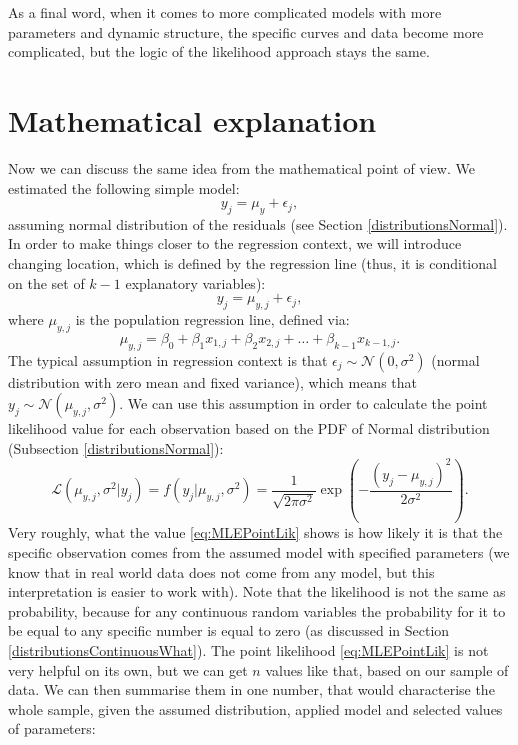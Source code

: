 \documentclass[
]{book}
\theoremstyle{definition}
\theoremstyle{definition}
\theoremstyle{definition}
\theoremstyle{definition}
\theoremstyle{remark}
\begin{document}
As a final word, when it comes to more complicated models with more parameters and dynamic structure, the specific curves and data become more complicated, but the logic of the likelihood approach stays the same.

\hypertarget{likelihoodApproachMaths}{%
\section{Mathematical explanation}\label{likelihoodApproachMaths}}

Now we can discuss the same idea from the mathematical point of view. We estimated the following simple model:
\begin{equation}
    y_j = \mu_{y} + \epsilon_j,
    \label{eq:MLEConstant}
\end{equation}
assuming normal distribution of the residuals (see Section \ref{distributionsNormal}). In order to make things closer to the regression context, we will introduce changing location, which is defined by the regression line (thus, it is conditional on the set of \(k-1\) explanatory variables):
\begin{equation}
    y_j = \mu_{y,j} + \epsilon_j,
    \label{eq:MLESimpleRegression}
\end{equation}
where \(\mu_{y,j}\) is the population regression line, defined via:
\begin{equation}
    \mu_{y,j} = \beta_0 + \beta_1 x_{1,j}+ \beta_2 x_{2,j} + \dots + \beta_{k-1} x_{k-1,j} .
    \label{eq:MLERegression}
\end{equation}
The typical assumption in regression context is that \(\epsilon_j \sim \mathcal{N}(0, \sigma^2)\) (normal distribution with zero mean and fixed variance), which means that \(y_j \sim \mathcal{N}(\mu_{y,j}, \sigma^2)\). We can use this assumption in order to calculate the point likelihood value for each observation based on the PDF of Normal distribution (Subsection \ref{distributionsNormal}):
\begin{equation}
    \mathcal{L} (\mu_{y,j}, \sigma^2 | y_j) = f(y_j | \mu_{y,j}, \sigma^2) = \frac{1}{\sqrt{2 \pi \sigma^2}} \exp \left( -\frac{\left(y_j - \mu_{y,j} \right)^2}{2 \sigma^2} \right).
    \label{eq:MLEPointLik}
\end{equation}
Very roughly, what the value \eqref{eq:MLEPointLik} shows is how likely it is that the specific observation comes from the assumed model with specified parameters (we know that in real world data does not come from any model, but this interpretation is easier to work with). Note that the likelihood is not the same as probability, because for any continuous random variables the probability for it to be equal to any specific number is equal to zero (as discussed in Section \ref{distributionsContinuousWhat}). The point likelihood \eqref{eq:MLEPointLik} is not very helpful on its own, but we can get \(n\) values like that, based on our sample of data. We can then summarise them in one number, that would characterise the whole sample, given the assumed distribution, applied model and selected values of parameters:
\end{document}

